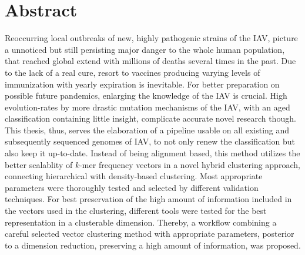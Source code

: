 \chapter*{Abstract}

Reoccurring local outbreaks of new, highly pathogenic strains of the \gls{IAV}, picture a unnoticed but still persisting major danger to the whole human population, that reached global extend with millions of deaths several times in the past. Due to the lack of a real cure, resort to vaccines producing varying levels of immunization with yearly expiration is inevitable. For better preparation on possible future pandemics, enlarging the knowledge of the \gls{IAV} is crucial. High evolution-rates by more drastic mutation mechanisms of the \gls{IAV}, with an aged classification containing little insight, complicate accurate novel research though. This thesis, thus, serves the elaboration of a pipeline usable on all existing and subsequently sequenced genomes of \gls{IAV}, to not only renew the classification but also keep it up-to-date. Instead of being alignment based, this method utilizes the better scalablity of $k$-mer frequency vectors in a novel hybrid clustering approach, connecting hierarchical with density-based clustering. Most appropriate parameters were thoroughly tested and selected by different validation techniques. For best preservation of the high amount of information included in the vectors used in the clustering, different tools were tested for the best representation in a clusterable dimension. Thereby, a workflow combining a careful selected vector clustering method with appropriate parameters, posterior to a dimension reduction, preserving a high amount of information, was proposed. 
